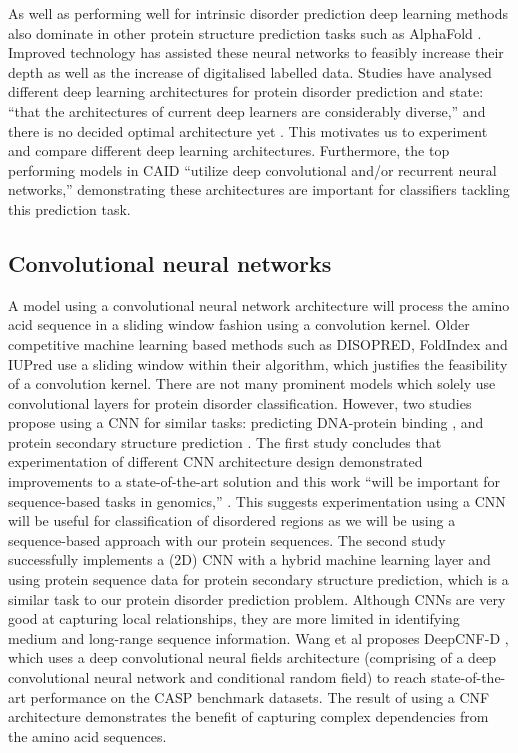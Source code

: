 \documentclass{l4proj}
\begin{document}
As well as performing well for intrinsic disorder prediction deep learning methods also dominate in other protein structure prediction tasks such as AlphaFold \citep{Jumper:21}. Improved technology has assisted these neural networks to feasibly increase their depth as well as the increase of digitalised labelled data. Studies have analysed different deep learning architectures for protein disorder prediction and state: “that the architectures of current deep learners are considerably diverse,” and there is no decided optimal architecture yet \citep{Zhao:22}. This motivates us to experiment and compare different deep learning architectures. Furthermore, the top performing models in CAID “utilize deep convolutional and/or recurrent neural networks,” \citep{Hu:21} demonstrating these architectures are important for classifiers tackling this prediction task.

\subsection{Convolutional neural networks}

A model using a convolutional neural network architecture will process the amino acid sequence in a sliding window fashion using a convolution kernel. Older competitive machine learning based methods such as DISOPRED, FoldIndex and IUPred use a sliding window within their algorithm, which justifies the feasibility of a convolution kernel. There are not many prominent models which solely use convolutional layers for protein disorder classification. However, two studies propose using a CNN for similar tasks: predicting DNA-protein binding \citep{Zeng:16}, and protein secondary structure prediction \citep{Ema:22}. The first study concludes that experimentation of different CNN architecture design demonstrated improvements to a state-of-the-art solution and this work “will be important for sequence-based tasks in genomics,” \citep{Zeng:16}. This suggests experimentation using a CNN will be useful for classification of disordered regions as we will be using a sequence-based approach with our protein sequences. The second study successfully implements a (2D) CNN with a hybrid machine learning layer and using protein sequence data for protein secondary structure prediction, which is a similar task to our protein disorder prediction problem. Although CNNs are very good at capturing local relationships, they are more limited in identifying medium and long-range sequence information. Wang et al proposes DeepCNF-D \citep{Wang:15}, which uses a deep convolutional neural fields architecture (comprising of a deep convolutional neural network and conditional random field) to reach state-of-the-art performance on the CASP benchmark datasets. The result of using a CNF architecture demonstrates the benefit of capturing complex dependencies from the amino acid sequences.
\end{document}
